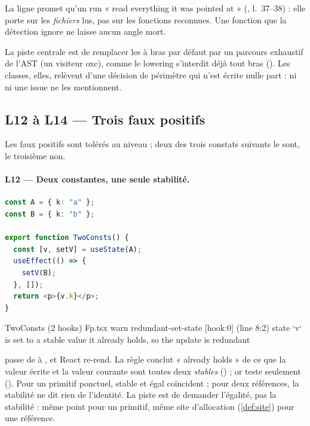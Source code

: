 \begin{piege}
La ligne  promet qu'un run « read everything it was pointed at » (, l.~37--38) : elle porte sur les \emph{fichiers} lus, pas sur les fonctions reconnues. Une fonction que la détection ignore ne laisse aucun angle mort.
\end{piege}

La piste centrale est de remplacer les  à bras par défaut  par un parcours exhaustif de l'AST (un visiteur oxc), comme le lowering s'interdit déjà tout bras \code{_ => \{\}} (). Les classes, elles, relèvent d'une décision de périmètre qui n'est écrite nulle part : ni  ni une issue ne les mentionnent.

\subsection{L12 à L14 --- Trois faux positifs}

Les faux positifs sont tolérés au niveau \Warning{} ; deux des trois constats suivants le sont, le troisième non.

\paragraph{L12 --- Deux constantes, une seule stabilité.}
\begin{lstlisting}[language=TypeScript,caption={\file{/tmp/r27/fp/Fp.tsx}, composant \code{TwoConsts}}]
const A = { k: "a" };
const B = { k: "b" };

export function TwoConsts() {
  const [v, setV] = useState(A);
  useEffect(() => {
    setV(B);
  }, []);
  return <p>{v.k}</p>;
}
\end{lstlisting}

\begin{sortie}
  TwoConsts  (2 hooks)  Fp.tsx
    warn   redundant-set-state  [hook:0]  (line 8:2)  state `v` is set to a stable value it already holds, so the update is redundant
\end{sortie}

 passe de  à , et React re-rend. La règle conclut « already holds » de ce que la valeur écrite et la valeur courante sont toutes deux \emph{stables} () ; or  teste seulement  (). Pour un primitif ponctuel, stable et égal coïncident ; pour deux références, la stabilité ne dit rien de l'identité. La piste est de demander l'égalité, pas la stabilité : même point pour un primitif, même site d'allocation (\cref{def:site}) pour une référence.

